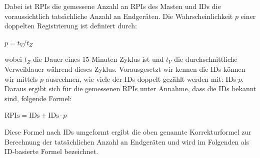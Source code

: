 \documentclass[conference,compsoc]{IEEEtran}
\begin{document}
Dabei ist \glqq RPIs\grqq{} die gemessene Anzahl an RPIs des Masten und \glqq IDs\grqq{}  die voraussichtlich tatsächliche Anzahl an Endgeräten.
Die Wahrscheinlichkeit $p$ einer doppelten Registrierung ist definiert durch:
\centerline{\text{ }}
\centerline{$p = t_V / t_Z$}
\centerline{\text{ }}
wobei $t_Z$ die Dauer eines 15-Minuten Zyklus ist und $t_V$ die durchschnittliche Verweildauer während dieses Zyklus.
Vorausgesetzt wir kennen die \glqq IDs\grqq{} können wir mittels $p$ ausrechnen, wie viele der IDs doppelt gezählt werden mit: IDs$\cdot p$. 
Daraus ergibt sich für die gemessenen \glqq RPIs\grqq{} unter Annahme, dass die IDs bekannt sind, folgende Formel: 
\centerline{\text{ }}
\centerline{$\text{RPIs} = \text{IDs} + \text{IDs} \cdot p $}
\centerline{\text{ }}
Diese Formel nach \glqq IDs\grqq{} umgeformt ergibt die oben genannte Korrekturformel zur Berechnung der tatsächlichen Anzahl an Endgeräten und wird im Folgenden als ID-basierte Formel bezeichnet.
\end{document}
